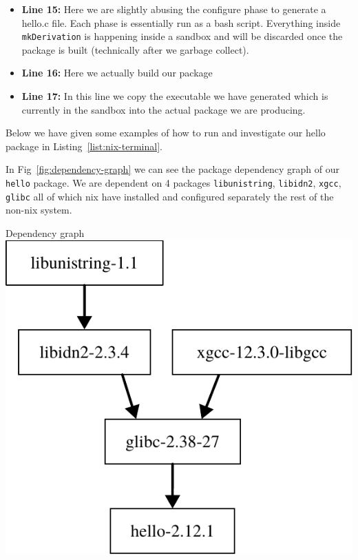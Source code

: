 {\begin{itemize}
  \item \textbf{Line 15:} Here we are slightly abusing the configure phase to generate a hello.c file. Each phase is essentially run as a bash script. Everything inside \texttt{mkDerivation} is happening inside a sandbox and will be discarded once the package is built (technically after we garbage collect). 
  
  \item \textbf{Line 16:} Here we actually build our package
  
  \item \textbf{Line 17:} In this line we copy the executable we have generated which is currently in the sandbox into the actual package we are producing. 
\end{itemize}
}
Below we have given some examples of how to run and investigate our hello package in Listing~\ref{list:nix-terminal}.


In Fig~\ref{fig:dependency-graph} we can see the package dependency graph of our \texttt{hello} package. We are dependent on 4 packages \texttt{libunistring}, \texttt{libidn2}, \texttt{xgcc}, \texttt{glibc} all of which nix have installed and configured separately the rest of the non-nix system. 

\begin{figureBox}[label = {fig:dependency-graph}, width=0.75\linewidth]{Dependency graph}
  \includegraphics[width=0.7\linewidth]{./background/figures/nix/hello-pkg.pdf}
\end{figureBox}
